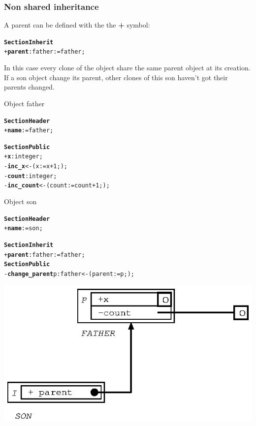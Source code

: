 \documentclass[11pt]{mybook}
\begin{document}
\subsubsection{Non shared inheritance}
\label{language_reference:section_identifiers:inherit_section:non_shared_inheritance}
%
A parent can be defined with the the {\bf{} +} symbol:
\begin{alltt}
{\bf{}Section Inherit}
  + {\bf{} parent}:{\sc{}father} := {\sc{}father};
\end{alltt}
In this case every clone of the object share the same parent object at its creation. If a son object change its parent, other clones of this son haven't got their parents changed.
\begin{center}
Object {\sc{}father}
\end{center}
\begin{alltt} 
{\bf{}Section Header}
  + {\bf{}name}     := {\sc{}father};          

{\bf{}Section Public}
  + {\bf{}x}    :{\sc{}integer};
  - {\bf{}inc\_x} <- ( x := x + 1; );
  - {\bf{}count}:{\sc{}integer};
  - {\bf{}inc\_count} <- ( count := count + 1; );
\end{alltt}
\begin{center}
Object {\sc{}son}
\end{center}
\begin{alltt} 
{\bf{}Section Header}
  + {\bf{}name}     := {\sc{}son};          

{\bf{}Section Inherit}
  + {\bf{}parent}:{\sc{}father} := {\sc{}father};
{\bf{}Section Public}
  - {\bf{}change\_parent} p:{\sc{}father} <- ( parent := p; );
\end{alltt}
\begin{center}
\includegraphics[scale=1.0]{figures/inherit_plus_0}
\end{center}
\end{document}
